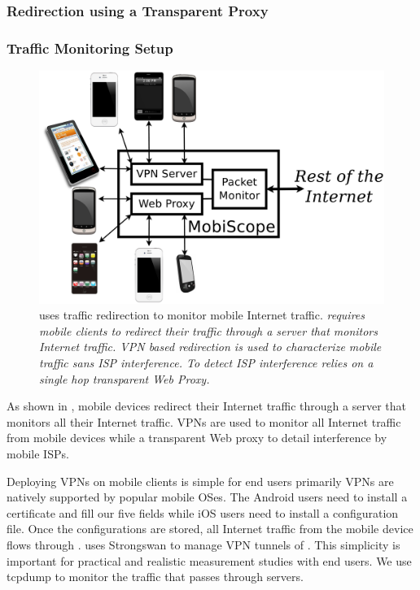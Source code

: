 \subsubsection{Redirection using a Transparent Proxy} 



\subsubsection{Traffic Monitoring Setup}

\begin{figure}
\includegraphics[width=\columnwidth]{figures/meddle-servers.pdf}
\caption{\platname uses traffic redirection to monitor mobile Internet traffic. \platname \emph{requires mobile clients to redirect their traffic through a server that monitors Internet traffic. VPN based redirection is used to characterize mobile traffic sans ISP interference. To detect ISP interference \platname relies on a single hop transparent Web Proxy.}}
\label{fig:description}
\end{figure}

As shown in , mobile devices redirect their Internet traffic through a \platname server that monitors all their Internet traffic. 
VPNs are used to monitor all Internet traffic from mobile devices while a transparent Web proxy to detail interference by mobile ISPs.

Deploying VPNs on mobile clients is simple for end users primarily VPNs are natively supported by popular mobile OSes. 
The Android users need to install a certificate and fill our five fields while iOS users need to install a configuration file. 
Once the configurations are stored, all Internet traffic from the mobile device flows through \platname. 
\platname uses Strongswan to manage VPN tunnels of \platname.
This simplicity is important for practical and realistic measurement studies with end users.
We use tcpdump to monitor the traffic that passes through \platname servers.

